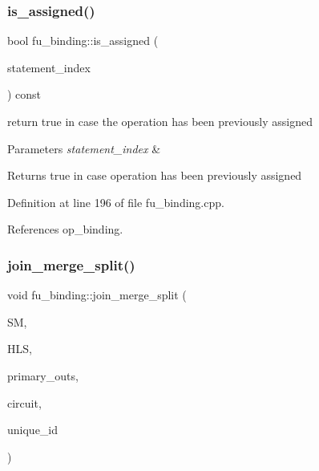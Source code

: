 \subsubsection{\texorpdfstring{is\+\_\+assigned()}{is\_assigned()}\hspace{0.1cm}{\footnotesize\ttfamily [2/2]}}
{\footnotesize\ttfamily bool fu\+\_\+binding\+::is\+\_\+assigned (\begin{DoxyParamCaption}\item[{const unsigned int}]{statement\+\_\+index }\end{DoxyParamCaption}) const}



return true in case the operation has been previously assigned 


\begin{DoxyParams}{Parameters}
{\em statement\+\_\+index} & \\
\hline
\end{DoxyParams}
\begin{DoxyReturn}{Returns}
true in case operation has been previously assigned 
\end{DoxyReturn}


Definition at line 196 of file fu\+\_\+binding.\+cpp.



References op\+\_\+binding.

\mbox{\label{classfu__binding_a7f20518e1518f5ad76bd1cce7cc010eb}} 
\subsubsection{\texorpdfstring{join\+\_\+merge\+\_\+split()}{join\_merge\_split()}}
{\footnotesize\ttfamily void fu\+\_\+binding\+::join\+\_\+merge\+\_\+split (\begin{DoxyParamCaption}\item[{const \hyperlink{structural__manager_8hpp_ab3136f0e785d8535f8d252a7b53db5b5}{structural\+\_\+manager\+Ref}}]{SM,  }\item[{const \hyperlink{hls_8hpp_a75d0c73923d0ddfa28c4843a802c73a7}{hls\+Ref}}]{H\+LS,  }\item[{std\+::map$<$ \hyperlink{structural__objects_8hpp_a8ea5f8cc50ab8f4c31e2751074ff60b2}{structural\+\_\+object\+Ref}, std\+::list$<$ \hyperlink{structural__objects_8hpp_a8ea5f8cc50ab8f4c31e2751074ff60b2}{structural\+\_\+object\+Ref} $>$, \hyperlink{structjms__sorter}{jms\+\_\+sorter} $>$ \&}]{primary\+\_\+outs,  }\item[{const \hyperlink{structural__objects_8hpp_a8ea5f8cc50ab8f4c31e2751074ff60b2}{structural\+\_\+object\+Ref}}]{circuit,  }\item[{unsigned int \&}]{unique\+\_\+id }\end{DoxyParamCaption})\hspace{0.3cm}{\ttfamily [virtual]}}



